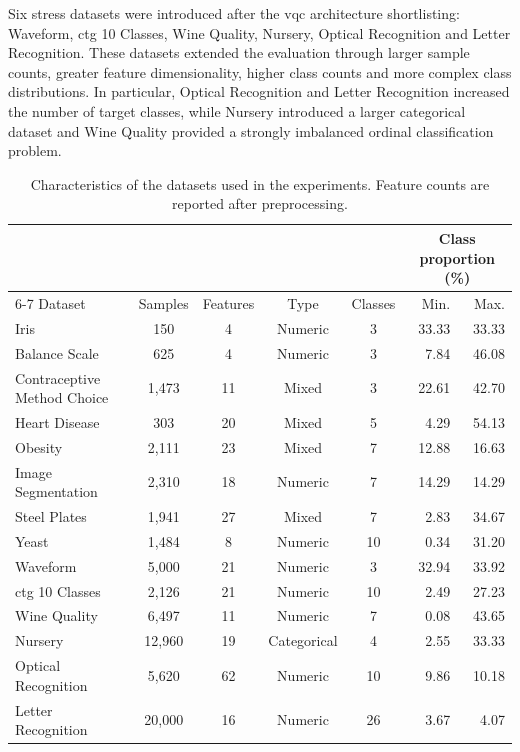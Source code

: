 \documentclass[]{UCD_CS_MSc_AAI_Report}
\begin{document}
Six stress datasets were introduced after the \ac{vqc} architecture shortlisting: Waveform, \ac{ctg} 10 Classes, Wine Quality, Nursery, Optical Recognition and Letter Recognition. These datasets extended the evaluation through larger sample counts, greater feature dimensionality, higher class counts and more complex class distributions. In particular, Optical Recognition and Letter Recognition increased the number of target classes, while Nursery introduced a larger categorical dataset and Wine Quality provided a strongly imbalanced ordinal classification problem.

\begin{table}[htb]
    \centering
    \small
    \caption{Characteristics of the datasets used in the experiments. Feature counts are reported after preprocessing.}
    \label{tab:datasets}
    \begin{tabular}{lccccrr}
        \toprule
        & & & & & \multicolumn{2}{c}{Class proportion (\%)} \\
        \cmidrule(lr){6-7}
        Dataset & Samples & Features & Type & Classes & Min. & Max. \\
        \midrule
        Iris                         & 150    & 4  & Numeric     & 3  & 33.33 & 33.33 \\
        Balance Scale                & 625    & 4  & Numeric     & 3  & 7.84  & 46.08 \\
        Contraceptive Method Choice  & 1,473  & 11 & Mixed       & 3  & 22.61 & 42.70 \\
        Heart Disease                & 303    & 20 & Mixed       & 5  & 4.29  & 54.13 \\
        Obesity                      & 2,111  & 23 & Mixed       & 7  & 12.88 & 16.63 \\
        Image Segmentation           & 2,310  & 18 & Numeric     & 7  & 14.29 & 14.29 \\
        Steel Plates                 & 1,941  & 27 & Mixed       & 7  & 2.83  & 34.67 \\
        Yeast                        & 1,484  & 8  & Numeric     & 10 & 0.34  & 31.20 \\
        \midrule
        Waveform                     & 5,000  & 21 & Numeric     & 3  & 32.94 & 33.92 \\
        \acs{ctg} 10 Classes         & 2,126  & 21 & Numeric     & 10 & 2.49  & 27.23 \\
        Wine Quality                 & 6,497  & 11 & Numeric     & 7  & 0.08  & 43.65 \\
        Nursery                      & 12,960 & 19 & Categorical & 4  & 2.55  & 33.33 \\
        Optical Recognition          & 5,620  & 62 & Numeric     & 10 & 9.86  & 10.18 \\
        Letter Recognition           & 20,000 & 16 & Numeric     & 26 & 3.67  & 4.07 \\
        \bottomrule
    \end{tabular}
\end{table}
\end{document}
